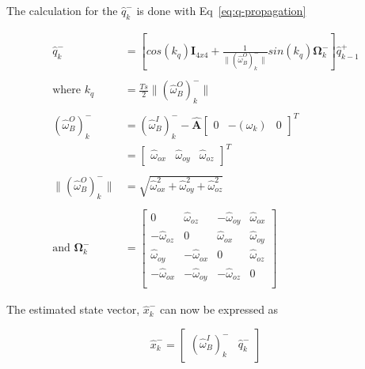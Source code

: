 The calculation for the $\hat{q}_k^-$ is done with Eq~\ref{eq:q-propagation} \cite{JansevanVuuren2015}

\begin{equation}
	\begin{aligned}
		\hat{q}_k^- &= \left[cos(k_q)\mathbf{I}_{4x4} + \frac{1}{\lVert (\hat{\omega}_B^O)_k^- \rVert} sin(k_q) \mathbf{\Omega}_k^- \right] \hat{q}_{k-1}^+ \\ \\
		\text{where } k_q &= \frac{Ts}{2} \lVert (\hat{\omega}_B^O)_k^- \rVert \\ \\
		(\hat{\omega}_B^O)_k^- &= (\hat{\omega}_B^I)_k^- - \hat{\mathbf{A}} \begin{bmatrix} 0 & -(\omega_k) & 0\end{bmatrix}^T \\
		&= \begin{bmatrix} \hat{\omega}_{ox} & \hat{\omega}_{oy}  & \hat{\omega}_{oz} \end{bmatrix}^T \\ \\
		\lVert (\hat{\omega}_B^O)_k^- \rVert &= \sqrt{\hat{\omega}_{ox}^2 + \hat{\omega}_{oy}^2 + \hat{\omega}_{oz}^2} \\ \\
		\text{and } \mathbf{\Omega}_k^- &= \begin{bmatrix} 
			0 & \hat{\omega}_{oz} & -\hat{\omega}_{oy} & \hat{\omega}_{ox} \\
			-\hat{\omega}_{oz} & 0 & \hat{\omega}_{ox} & \hat{\omega}_{oy}			\\
			\hat{\omega}_{oy} & -\hat{\omega}_{ox} & 0 & \hat{\omega}_{oz}			\\
			-\hat{\omega}_{ox} & -\hat{\omega}_{oy} & -\hat{\omega}_{oz} & 0			\\
		\end{bmatrix}
	\end{aligned}
	\label{eq:q-propagation}
\end{equation}

The estimated state vector, $\hat{x}_k^-$ can now be expressed as 

\begin{equation}
	\hat{x}_k^- = \begin{bmatrix} (\hat{\omega}_B^I)_k^- & \hat{q}_k^-\end{bmatrix}
\end{equation}


